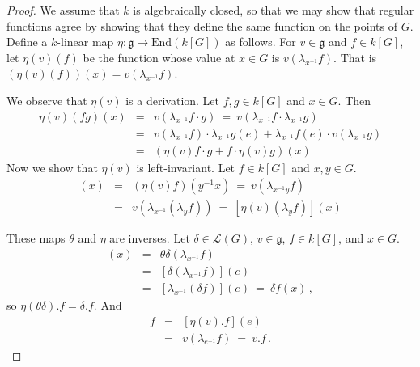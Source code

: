 \documentclass[12pt]{amsart}
\begin{document}
\begin{proof}
We assume that $k$ is algebraically closed, so that we may show that regular
functions agree by showing that they define the same function on the points
of $G$.
Define a $k$-linear map 
$\eta\colon{\mathfrak g}\to \mbox{End}(k[G])$ as follows.
For $v\in {\mathfrak g}$  and $f\in k[G]$, let $\eta(v)(f)$ be the function
whose value at $x\in G$ is $v(\lambda_{x^{-1}}f)$.
That is $(\eta(v)(f))(x)= v(\lambda_{x^{-1}}f)$.

We observe that $\eta(v)$ is a derivation.
Let $f,g\in k[G]$ and $x\in G$.
Then
\begin{eqnarray*}
\eta(v)(fg)(x)&=& v(\lambda_{x^{-1}}f\cdot g)\ =\ 
         v(\lambda_{x^{-1}}f \cdot\lambda_{x^{-1}}g)\\
   &=& v(\lambda_{x^{-1}}f)\cdot \lambda_{x^{-1}}g(e) +
       \lambda_{x^{-1}}f(e)\cdot v(\lambda_{x^{-1}}g)\\
    &=& (\eta(v)f\cdot g + f\cdot \eta(v)g) (x)
\end{eqnarray*}
Now we show that $\eta(v)$ is left-invariant.
Let $f\in k[G]$ and $x,y\in G$.
\begin{eqnarray*}
[\lambda_y(\eta(v)f)](x)&=&
           (\eta(v)f)(y^{-1}x) \ =\ v(\lambda_{x^{-1}y}f)\\
    &=& v(\lambda_{x^{-1}}(\lambda_yf))\ =\ 
       [\eta(v)(\lambda_y f)](x)
\end{eqnarray*}

These maps $\theta$ and $\eta$ are inverses.
Let $\delta\in{\mathcal L}(G)$, $v\in{\mathfrak g}$, $f\in k[G]$, and 
$x\in G$.
\begin{eqnarray*}
 [\eta(\theta \delta).f](x) 
   &=& \theta\delta(\lambda_{x^{-1}}f)\\
   &=& [\delta(\lambda_{x^{-1}}f)](e)\\
   &=& [\lambda_{x^{-1}}(\delta f)](e)\ =\ \delta f(x)\,,
\end{eqnarray*}
so $\eta(\theta\delta).f=\delta.f$.
And
\begin{eqnarray*}
  [\theta(\eta v)]f  &=& [\eta(v).f](e)\\
   &=& v(\lambda_{e^{-1}}f)\ =\ v.f\,.
\end{eqnarray*}



\end{proof}
\end{document}
